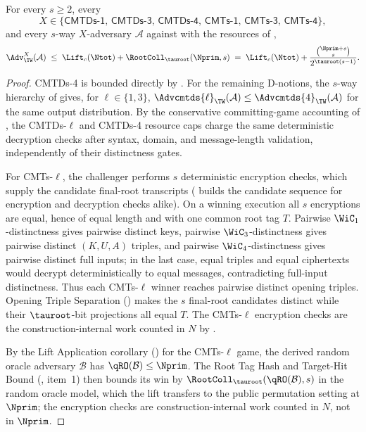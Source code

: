\begin{corollary}
\label{cor:committing-combined}
For every $s \geq 2$, every
\[
  X \in \bigl\{\mathsf{CMTDs\text{-}1},\, \mathsf{CMTDs\text{-}3},\,
              \mathsf{CMTDs\text{-}4},\, \mathsf{CMTs\text{-}1},\,
              \mathsf{CMTs\text{-}3},\, \mathsf{CMTs\text{-}4}\bigr\},
\]
and every $s$-way $X$-adversary $\mathcal{A}$ against \TW{} with the
resources of ,
\[
  \Adv^X_\TW(\mathcal{A})
  \;\leq\;
  \Lift_c(\Ntot) + \RootColl_{\tauroot}(\Nprim, s)
  \;=\;
  \Lift_c(\Ntot) + \frac{\binom{\Nprim + s}{s}}{2^{\tauroot(s-1)}}.
\]
\end{corollary}

\begin{proof}
CMTDs-4 is bounded directly by . For the remaining
D-notions, the $s$-way hierarchy of \cite[\S3, Fig.~5 and
App.~A]{BH22} gives, for $\ell \in \{1,3\}$,
$\Advcmtds{\ell}_\TW(\mathcal{A}) \leq
\Advcmtds{4}_\TW(\mathcal{A})$ for the same output distribution. By the
conservative committing-game accounting of , the
CMTDs-$\ell$ and CMTDs-4 resource caps charge the same deterministic
decryption checks after syntax, domain, and message-length validation,
independently of their distinctness gates.

For CMTs-$\ell$, the challenger performs $s$ deterministic encryption
checks, which supply the candidate final-root transcripts
( builds the candidate sequence for
encryption and decryption checks alike). On a winning execution all
$s$ encryptions are equal, hence of equal length and with one common root
tag $T$. Pairwise $\WiC_1$-distinctness gives pairwise distinct keys,
pairwise $\WiC_3$-distinctness gives pairwise distinct $(K,U,A)$ triples,
and pairwise $\WiC_4$-distinctness gives pairwise distinct full inputs; in
the last case, equal triples and equal ciphertexts would decrypt
deterministically to equal messages, contradicting full-input
distinctness. Thus each CMTs-$\ell$ winner reaches pairwise distinct
opening triples. Opening Triple Separation () makes
the $s$ final-root candidates distinct while their $\tauroot$-bit
projections all equal $T$.
The CMTs-$\ell$ encryption checks are the construction-internal work
counted in $N$ by .

By the Lift Application corollary () for the
CMTs-$\ell$ game, the derived random oracle adversary $\mathcal{B}$ has
$\qRO(\mathcal{B}) \leq \Nprim$. The Root Tag Hash and Target-Hit Bound
(, item~1) then bounds its win by
$\RootColl_{\tauroot}(\qRO(\mathcal{B}), s)$ in the random oracle model,
which the lift transfers to the public permutation setting at $\Nprim$;
the encryption checks are construction-internal work counted in $N$, not
in $\Nprim$.
\end{proof}
